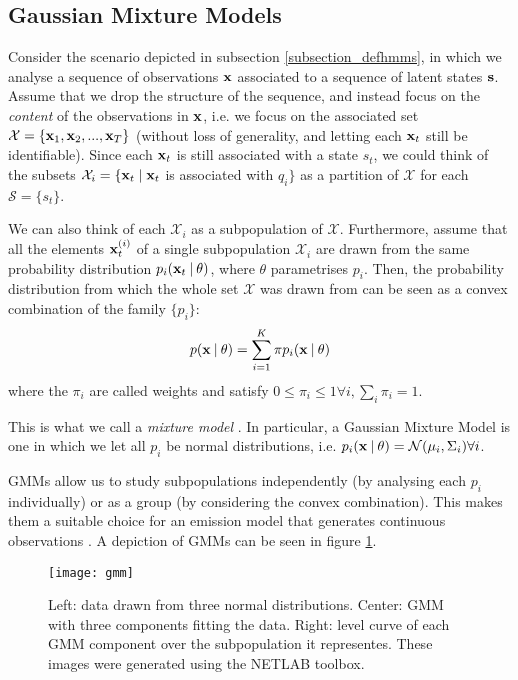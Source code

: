 \documentclass[../main.tex]{subfiles}
\begin{document}
\subsection{Gaussian Mixture Models}\label{subsection_gmm}
Consider the scenario depicted in subsection \ref{subsection_defhmms}, in which we analyse a sequence of observations $\mathbf{x}$ associated to a sequence of latent states $\mathbf{s}$. Assume that we drop the structure of the sequence, and instead focus on the \emph{content} of the observations in $\mathbf{x}$, i.e. we focus on the associated set $\mathcal{X} = \{\mathbf{x}_1, \mathbf{x}_2, ..., \mathbf{x}_T\}$ (without loss of generality, and letting each $\mathbf{x}_t$ still be identifiable). Since each $\mathbf{x}_t$ is still associated with a state $s_t$, we could think of the subsets $\mathcal{X}_i = \{\mathbf{x}_t \mid \mathbf{x}_t$ is associated with $q_i \}$ as a partition of $\mathcal{X}$ for each $\mathcal{S} = \{s_t\}$.
\par We can also think of each $\mathcal{X}_i$ as a subpopulation of $\mathcal{X}$. Furthermore, assume that all the elements $\mathbf{x}_t^{(i)}$ of a single subpopulation $\mathcal{X}_i$ are drawn from the same probability distribution $p_i(\mathbf{x}_t \:\vert\: \theta)$, where $\theta$ parametrises $p_i$. Then, the probability distribution from which the whole set $\mathcal{X}$ was drawn from can be seen as a convex combination of the family $\{p_i\}$:
\begin{equation} \label{eq:mixmod}
p(\mathbf{x} \:\vert\: \theta ) = \sum_{i=1}^K\pi p_i(\mathbf{x} \:\vert\: \theta)
\end{equation}
where the $\pi_i$ are called weights and satisfy  $0 \leq \pi_i \leq 1 \forall i, \sum_i \pi_i = 1$. 
\par This is what we call a \emph{mixture model} \cite{Murphy2012}. In particular, a Gaussian Mixture Model is one in which we let all $p_i$ be normal distributions, i.e. $p_i(\mathbf{x} \:\vert\: \theta) = \mathcal{N}(\mathbf{\mu}_i, \Sigma_i) \forall i$.
\par GMMs allow us to study subpopulations independently (by analysing each $p_i$ individually) or as a group (by considering the convex combination). This makes them a suitable choice for an emission model that generates continuous observations \cite{Jurafsky2009}. A depiction of GMMs can be seen in figure \ref{fig_gmm}.
\begin{figure}[t]
\centering
\texttt{[image: gmm]}
\caption{Left: data drawn from three normal distributions. Center: GMM with three components fitting the data. Right: level curve of each GMM component over the subpopulation it representes. These images were generated using the NETLAB toolbox.}
\label{fig_gmm}
\end{figure}
\end{document}
